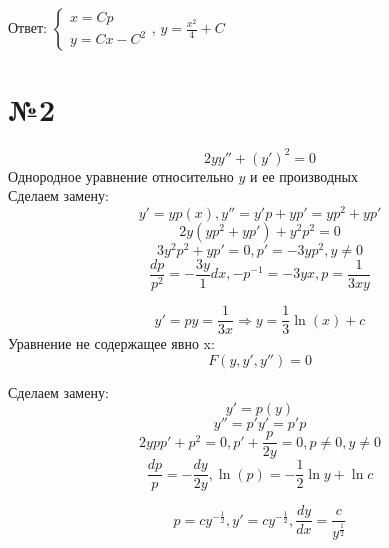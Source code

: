 \documentclass{article}
\begin{document}
Ответ: $\begin{cases}
    x = Cp \\
    y = Cx - C^2
    \end{cases}$,
    $y = \frac{x^2}{4} + C$

\section*{№2}
\begin{equation*}
    2yy'' + (y')^2 = 0
\end{equation*}
Однородное уравнение относительно $y$ и ее производных\\
Сделаем замену:
\begin{equation*}
    y' = yp(x), y'' = y'p + yp' = yp^2 + yp'
\end{equation*}
\begin{equation*}
    2y(yp^2 + yp') + y^2p^2 = 0
\end{equation*}
\begin{equation*}
    3y^2p^2 + yp' = 0, p' = -3yp^2, y \ne 0
\end{equation*}
\begin{equation*}
    \frac{dp}{p^2} = -\frac{3y}{1}dx, -p^{-1} = -3yx, p = \frac{1}{3xy}
\end{equation*}

\begin{equation*}
    y' = py = \frac{1}{3x} \Rightarrow y = \frac{1}{3}\ln{(x)} + c
\end{equation*}
Уравнение не содержащее явно x:
\begin{equation*}
    F(y, y', y'') = 0
\end{equation*}

Сделаем замену:
\begin{equation*}
    y' = p(y) 
\end{equation*}
\begin{equation*}
    y'' = p'y' = p'p
\end{equation*}
\begin{equation*}
    2ypp' + p^2 = 0, p' + \frac{p}{2y} = 0, p \ne 0 , y \ne 0
\end{equation*}
\begin{equation*}
    \frac{dp}{p} = -\frac{dy}{2y} , \ln{(p)} = -\frac{1}{2}\ln{y} + \ln{c}
\end{equation*}

\begin{equation*}
    p = c y^{-\frac{1}{2}}, y' = cy^{-\frac{1}{2}}, \frac{dy}{dx} = \frac{c}{y^{\frac{1}{2}}}
\end{equation*}
\end{document}
